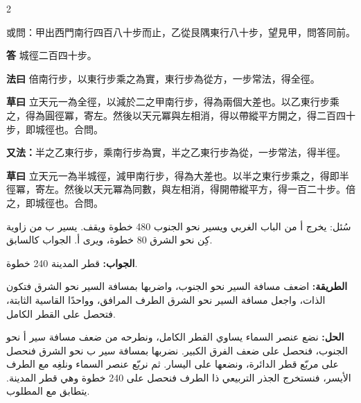 \documentclass[11pt,a4paper]{article}
\newcommand{\ar}[1]{\arabicfont\beginR #1\endR}
\newcommand{\Answer}[1]{\par\noindent\textbf{\color{problemcolor}答} #1\par}
\newcommand{\Method}[1]{\par\noindent\textbf{\color{problemcolor}法曰} #1\par}
\newcommand{\Workings}[1]{\par\noindent\textbf{\color{problemcolor}草曰} #1\par}
\newcommand{\AnswerAr}{\par\noindent\textbf{\color{problemcolor}\ar{الجواب:}} }
\newcommand{\MethodAr}{\par\noindent\textbf{\color{problemcolor}\ar{الطريقة:}} }
\newcommand{\WorkingsAr}{\par\noindent\textbf{\color{problemcolor}\ar{الحل:}} }
\begin{document}
\begin{paracol}{2}

\noindent 或問：甲出西門南行四百八十步而止，乙從艮隅東行八十步，望見甲，問答同前。

\vspace{0.2cm}

\Answer{城徑二百四十步。}

\vspace{0.2cm}

\Method{倍南行步，以東行步乘之為實，東行步為從方，一步常法，得全徑。}

\vspace{0.2cm}

\Workings{立天元一為全徑，以減於二之甲南行步，得為兩個大差也。以乙東行步乘之，得為圓徑冪，寄左。然後以天元冪與左相消，得以帶縱平方開之，得二百四十步，即城徑也。合問。}

\vspace{0.2cm}

\noindent\textbf{又法：}半之乙東行步，乘南行步為實，半之乙東行步為從，一步常法，得半徑。

\vspace{0.2cm}

\Workings{立天元一為半城徑，減甲南行步，得為大差也。以半之東行步乘之，得即半徑冪，寄左。然後以天元冪為同數，與左相消，得開帶縱平方，得一百二十步。倍之，即城徑也。合問。}

\switchcolumn

\ar{سُئل: يخرج أ من الباب الغربي ويسير نحو الجنوب 480 خطوة ويقف. يسير ب من زاوية كِن نحو الشرق 80 خطوة، ويرى أ. الجواب كالسابق.}

\vspace{0.2cm}

\AnswerAr{قطر المدينة 240 خطوة.}

\vspace{0.2cm}

\MethodAr{اضعف مسافة السير نحو الجنوب، واضربها بمسافة السير نحو الشرق فتكون الذات، واجعل مسافة السير نحو الشرق الطرف المرافق، وواحدًا القاسية الثابتة، فتحصل على القطر الكامل.}

\vspace{0.2cm}

\WorkingsAr{نضع عنصر السماء يساوي القطر الكامل، ونطرحه من ضعف مسافة سير أ نحو الجنوب، فنحصل على ضعف الفرق الكبير. نضربها بمسافة سير ب نحو الشرق فنحصل على مربّع قطر الدائرة، ونضعها على اليسار. ثم نربّع عنصر السماء ونلغِه مع الطرف الأيسر، فنستخرج الجذر التربيعي ذا الطرف فنحصل على 240 خطوة وهي قطر المدينة. يتطابق مع المطلوب.}


\end{paracol}
\end{document}

